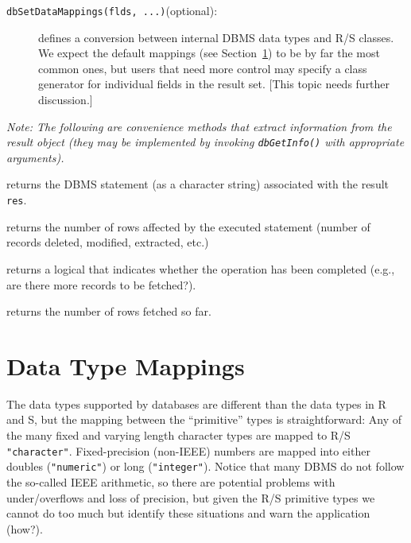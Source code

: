 \documentclass{article}
\newcommand{\sfun}[1]{\mbox{\tt #1()}}  %
\newcommand{\sobj}[1]{\mbox{\tt #1}}    %
\newcommand{\smethod}[1]{\mbox{\tt #1}} %
\begin{document}
\begin{description}
\item[\smethod{dbSetDataMappings(flds, ...)}(optional):] 
  defines a conversion between internal DBMS data types
  and R/S classes.  We expect the default mappings (see
  Section~\ref{sec:data-mappings}) to be by far the most
  common ones, but users that need more control may specify
  a class generator for individual fields in the result set.
  [This topic needs further discussion.]

\end{description}

\emph{Note: The following are convenience methods that extract
information from the result object (they may be implemented
by invoking \sfun{dbGetInfo} with appropriate arguments).  
}

\begin{description}\label{meth:res-others}
\item[\smethod{dbGetStatement(res, ...)}(optional):]
  returns the DBMS statement (as a character string) associated
  with the result \sobj{res}.

\item[\smethod{dbGetRowsAffected(res, ...)}(optional):]
  returns the number of rows affected by the executed statement
  (number of records deleted, modified, extracted, etc.)

\item[\smethod{dbHasCompleted(res, ...)}(optional):] 
  returns a logical that indicates whether the operation has been
  completed (e.g., are there more records to be fetched?).

\item[\smethod{dbGetRowCount(res, ...)}(optional):]
  returns the number of rows fetched so far.

\end{description}

\section{Data Type Mappings}\label{sec:data-mappings}
The data types supported by databases are different than the
data types in R and S, but the mapping between the ``primitive''
types is straightforward:  Any of the many fixed and varying
length character types are mapped to R/S \sobj{"character"}.
Fixed-precision (non-IEEE) numbers are mapped into either doubles
(\sobj{"numeric"}) or long (\sobj{"integer"}). Notice that many
DBMS do not follow the so-called IEEE arithmetic, so there are
potential problems with under/overflows and loss of precision, but
given the R/S primitive types we cannot do too much but identify
these situations and warn the application (how?).
\end{document}
